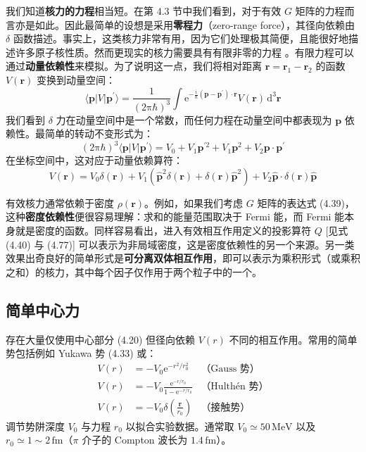我们知道\textbf{核力的力程}相当短。在第 4.3 节中我们看到，对于有效 $G$ 矩阵的力程而言亦是如此。因此最简单的设想是采用\textbf{零程力}（zero-range
force），其径向依赖由 $\delta$ 函数描述。事实上，这类核力非常有用，因为它们处理极其简便，且能很好地描述许多原子核性质。然而更现实的核力需要具有有限非零的力程
\cite{AS71,Sch72b}。有限力程可以通过\textbf{动量依赖性}来模拟。为了说明这一点，我们将相对距离 $\boldsymbol{r}=\boldsymbol{r}_{1}-\boldsymbol{r}_{2}$
的函数 $V(\boldsymbol{r})$ 变换到动量空间：
\begin{equation}
\langle\boldsymbol{p}|V|\boldsymbol{p}^{\prime}\rangle=\frac{1}{(2\mathrm{\pi}\hbar)^{3}}\int\mathrm{e}^{-\frac{\mathrm{i}}{\hbar}(\boldsymbol{p}-\boldsymbol{p}^{\prime})\cdot\boldsymbol{r}}V(\boldsymbol{r})\,\mathrm{d}^{3}\boldsymbol{r}\label{eq:4.97}
\end{equation}
我们看到 $\delta$ 力在动量空间中是一个常数，而任何力程在动量空间中都表现为 $\boldsymbol{p}$ 依赖性。最简单的转动不变形式为：
\begin{equation}
(2\mathrm{\pi}\hbar)^{3}\langle\boldsymbol{p}|V|\boldsymbol{p}^{\prime}\rangle=V_{0}+V_{1}\boldsymbol{p}^{\prime2}+V_{1}\boldsymbol{p}^{2}+V_{2}\boldsymbol{p}\cdot\boldsymbol{p}^{\prime}\label{eq:4.98}
\end{equation}
在坐标空间中，这对应于动量依赖算符：
\begin{equation}
V(\boldsymbol{r})=V_{0}\delta(\boldsymbol{r})+V_{1}(\hat{\boldsymbol{p}}^{2}\delta(\boldsymbol{r})+\delta(\boldsymbol{r})\hat{\boldsymbol{p}}^{2})+V_{2}\hat{\boldsymbol{p}}\cdot\delta(\boldsymbol{r})\hat{\boldsymbol{p}}\label{eq:4.99}
\end{equation}

有效核力通常依赖于密度 $\rho(\boldsymbol{r})$。例如，如果我们考虑 $G$ 矩阵的表达式 (4.39)，这种\textbf{密度依赖性}便很容易理解：求和的能量范围取决于
Fermi 能，而 Fermi 能本身就是密度的函数。同样容易看出，进入有效相互作用定义的投影算符 $Q$ {[}见式 (4.40)
与 (4.77){]} 可以表示为非局域密度，这是密度依赖性的另一个来源。另一类效果出奇良好的简单形式是\textbf{可分离双体相互作用}，即可以表示为乘积形式（或乘积之和）的核力，其中每个因子仅作用于两个粒子中的一个。

\subsection{简单中心力}

存在大量仅使用中心部分 (4.20) 但径向依赖 $V(r)$ 不同的相互作用。常用的简单势包括例如 Yukawa 势 (4.33)
或：
\begin{align}
V(r) & =-V_{0}\mathrm{e}^{-r^{2}/r^{2}_{0}} & \text{（Gauss 势）}\label{eq:4.100}\\
V(r) & =-V_{0}\frac{\mathrm{e}^{-r/r_{0}}}{1-\mathrm{e}^{-r/r_{0}}} & \text{（Hulthén 势）}\label{eq:4.101}\\
V(r) & =-V_{0}\delta\left(\frac{\boldsymbol{r}}{r_{0}}\right) & \text{（接触势）}\label{eq:4.102}
\end{align}
调节势阱深度 $V_{0}$ 与力程 $r_{0}$ 以拟合实验数据。通常取 $V_{0}\simeq50\,\text{MeV}$
以及 $r_{0}\simeq1\sim2\,\text{fm}$（$\pi$ 介子的 Compton 波长为 $1.4\,\text{fm}$）。

